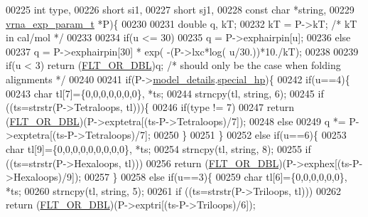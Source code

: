\begin{DoxyCode}
00225               \textcolor{keywordtype}{int} type,
00226               \textcolor{keywordtype}{short} si1,
00227               \textcolor{keywordtype}{short} sj1,
00228               \textcolor{keyword}{const} \textcolor{keywordtype}{char} *\textcolor{keywordtype}{string},
00229               \hyperlink{group__energy__parameters_structvrna__exp__param__s}{vrna\_exp\_param\_t} *P)\{
00230 
00231   \textcolor{keywordtype}{double} q, kT;
00232   kT = P->kT;   \textcolor{comment}{/* kT in cal/mol  */}
00233 
00234   \textcolor{keywordflow}{if}(u <= 30)
00235     q = P->exphairpin[u];
00236   \textcolor{keywordflow}{else}
00237     q = P->exphairpin[30] * exp( -(P->lxc*log( u/30.))*10./kT);
00238 
00239   \textcolor{keywordflow}{if}(u < 3) \textcolor{keywordflow}{return} (\hyperlink{group__data__structures_ga31125aeace516926bf7f251f759b6126}{FLT\_OR\_DBL})q; \textcolor{comment}{/* should only be the case when folding alignments */}
00240 
00241   \textcolor{keywordflow}{if}(P->\hyperlink{group__energy__parameters_ac18055127bccc27c1223f1d2f3b01b53}{model\_details}.\hyperlink{group__model__details_add64a96d23e77ef1d0ddf8dfc5228143}{special\_hp})\{
00242     \textcolor{keywordflow}{if}(u==4)\{
00243       \textcolor{keywordtype}{char} tl[7]=\{0,0,0,0,0,0,0\}, *ts;
00244       strncpy(tl, \textcolor{keywordtype}{string}, 6);
00245       \textcolor{keywordflow}{if} ((ts=strstr(P->Tetraloops, tl)))\{
00246         \textcolor{keywordflow}{if}(type != 7)
00247           \textcolor{keywordflow}{return} (\hyperlink{group__data__structures_ga31125aeace516926bf7f251f759b6126}{FLT\_OR\_DBL})(P->exptetra[(ts-P->Tetraloops)/7]);
00248         \textcolor{keywordflow}{else}
00249           q *= P->exptetra[(ts-P->Tetraloops)/7];
00250       \}
00251     \}
00252     \textcolor{keywordflow}{else} \textcolor{keywordflow}{if}(u==6)\{
00253       \textcolor{keywordtype}{char} tl[9]=\{0,0,0,0,0,0,0,0,0\}, *ts;
00254       strncpy(tl, \textcolor{keywordtype}{string}, 8);
00255       \textcolor{keywordflow}{if} ((ts=strstr(P->Hexaloops, tl)))
00256         \textcolor{keywordflow}{return}  (\hyperlink{group__data__structures_ga31125aeace516926bf7f251f759b6126}{FLT\_OR\_DBL})(P->exphex[(ts-P->Hexaloops)/9]);
00257     \}
00258     \textcolor{keywordflow}{else} \textcolor{keywordflow}{if}(u==3)\{
00259       \textcolor{keywordtype}{char} tl[6]=\{0,0,0,0,0,0\}, *ts;
00260       strncpy(tl, \textcolor{keywordtype}{string}, 5);
00261       \textcolor{keywordflow}{if} ((ts=strstr(P->Triloops, tl)))
00262         \textcolor{keywordflow}{return} (\hyperlink{group__data__structures_ga31125aeace516926bf7f251f759b6126}{FLT\_OR\_DBL})(P->exptri[(ts-P->Triloops)/6]);

\end{DoxyCode}
